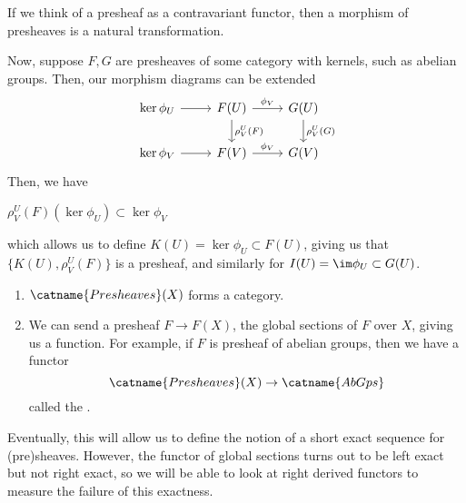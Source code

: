 \documentclass[11pt,leqno,oneside]{amsbook}
\renewcommand{\F}{F}
\newcommand{\G}{G}
\numberwithin{thm}{section}
\begin{document}
\begin{rmk}
  If we think of a presheaf as a contravariant functor, then a
  morphism of presheaves is a natural transformation.
\end{rmk}
Now, suppose \(F,G\) are presheaves of some category with kernels,
such as abelian groups. Then, our morphism diagrams can be extended \[
    \begin{tikzcd}
      \ker \phi_U \ar[r] & \F(U) \ar[d,"\rho^U_V(\F)"] \ar[r,"\phi_V"]
      & \G(U) 
      \ar[d,"\rho^U_V(\G)"] \\
      \ker \phi_V \ar[r] & \F(V) \ar[r, "\phi_V"] & \G(V)
    \end{tikzcd}
  \]
Then, we have
\begin{prop}
  \(\rho^U_V(F)(\ker \phi_U) \subset \ker \phi_V\)
\end{prop}
which allows us to define \(K(U) = \ker \phi_U \subset \F(U)\), giving
us that \(\{K(U), \rho^U_V(\F)\}\) is a presheaf, and similarly for
\(I(U) = \im \phi_U \subset \G(U)\).
\begin{prop}
  \begin{enumerate}
  \item \(\catname{Presheaves}(X)\) forms a category.
  \item We can send a presheaf \(\F \to \F(X)\), the global sections
    of \(\F\) over \(X\), giving us a function. For example, if \(\F\)
    is presheaf of abelian groups, then we have a functor \[
      \catname{Presheaves}(X) \to \catname{AbGps}
    \]
    called the .
  \end{enumerate}
\end{prop}
Eventually, this will allow us to define the notion of a short exact
sequence for (pre)sheaves. However, the functor of global sections
turns out to be left exact but not right exact, so we will be able to
look at right derived functors to measure the failure of this
exactness.
\end{document}
